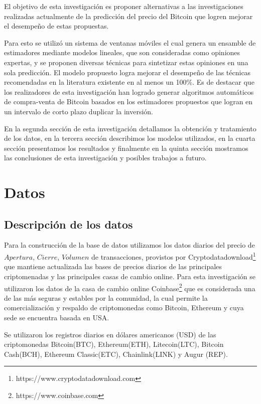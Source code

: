 \documentclass[a4paper,12pt,twocolumn]{article}
\begin{document}
El objetivo de esta investigación es proponer alternativas a las investigaciones realizadas actualmente de la predicción del precio del Bitcoin que logren mejorar el desempeño de estas propuestas. 

Para esto se utilizó un sistema de ventanas móviles el cual genera un ensamble de estimadores mediante modelos lineales, que son consideradas como opiniones expertas, y se proponen diversas técnicas para sintetizar estas opiniones en una sola predicción. El modelo propuesto logra mejorar el desempeño de las técnicas recomendadas en la literatura existente en al menos un 100\%. Es de destacar que los realizadores de esta investigación han logrado generar algoritmos automáticos de compra-venta de Bitcoin  basados en los estimadores propuestos que logran en un  intervalo de corto plazo duplicar la inversión.  


En la segunda sección de esta investigación detallamos la obtención y tratamiento de los datos, en la tercera sección describimos los modelos utilizados, en la cuarta sección presentamos los resultados y finalmente en la quinta sección mostramos las conclusiones de esta investigación y posibles trabajos a futuro.



\section{Datos}
\subsection{Descripción de los datos}

Para la construcción de la base de datos utilizamos los datos diarios del precio de $Apertura$, $Cierre$, $Volumen$ de transacciones, provistos por Cryptodatadownload\footnote{https://www.cryptodatadownload.com}  que mantiene actualizada las bases de precios diarios de las principales criptomenadas y las principales casas de cambio online. Para esta investigación se utilizaron los datos de la casa de cambio online Coinbase\footnote{https://www.coinbase.com} que es considerada una de las más seguras y estables por la comunidad, la cual permite la comercialización y respaldo de criptomonedas como Bitcoin, Ethereum y cuya sede se encuentra basada en USA. 

Se utilizaron los registros diarios en dólares americanos (USD)  de las criptomonedas Bitcoin(BTC), Ethereum(ETH), Litecoin(LTC), Bitcoin Cash(BCH), Ethereum Classic(ETC), Chainlink(LINK) y  Augur (REP). 
\end{document}
